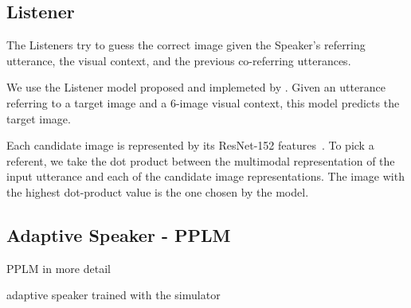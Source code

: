 \subsection{Listener}
\label{sec:listener}

The Listeners try to guess the correct image given the Speaker's referring utterance, the visual context, and the previous co-referring utterances.


We use the Listener model proposed and implemeted by \citet{takmaz-etal-2020-refer}. Given an utterance referring to a target image and a $6$-image visual context, this model predicts the target image.

Each candidate image is represented by its ResNet-152 features~\cite{resnet2016}. To pick a referent, we take the dot product between the multimodal representation of the input utterance and each of the candidate image representations. The image with the highest dot-product value is the one chosen by the model. 

\subsection{Adaptive Speaker - PPLM}
\label{sec:adapts}
PPLM in more detail

adaptive speaker trained with the simulator
